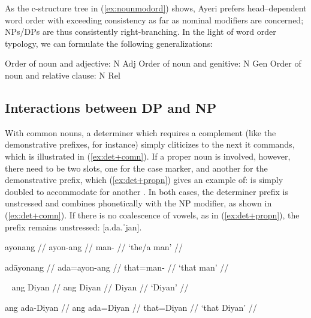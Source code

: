 As the c-structure tree in (\ref{ex:nounmodord}) shows, Ayeri prefers 
head--dependent word order with exceeding consistency as far as nominal 
modifiers are concerned; NPs/DPs are thus consistently right-branching. In the 
light of word order typology, we can formulate the following generalizations:

\pex
\a Order of noun and adjective: N Adj
\a Order of noun and genitive: N Gen
\a Order of noun and relative clause: N Rel
\xe

\subsection{Interactions between DP and NP}
\label{subsec:dpnpinteract}

With common nouns, a determiner which requires a complement (like the
demonstrative prefixes, for instance) simply cliticizes to the next 
it commands, which is illustrated in (\ref{ex:det+comn}). If a proper noun is
involved, however, there need to be two  slots, one for the case
marker, and another for the demonstrative prefix, which (\ref{ex:det+propn})
gives an example of:  is simply doubled to accommodate for another
. In both cases, the determiner prefix is unstressed and combines 
phonetically with the NP modifier, as shown in (\ref{ex:det+comn}). If there is
no coalescence of vowels, as in (\ref{ex:det+propn}), the prefix remains
unstressed:  [a.da.ˈjan].

\begin{multicols}{2}
\pex\label{ex:det+comn}
\a\begingl
	\gla ayonang //
	\glb ayon-ang //
	\glc man-\Aarg{} //
	\glft `the/a man' //
\endgl

\a\begingl
	\gla adāyonang //
	\glb ada=ayon-ang //
	\glc that=man-\Aarg{} //
	\glft `that man' //
\endgl

\xe

\pex~\label{ex:det+propn}
\a\begingl
	\gla ang Diyan //
	\glb ang Diyan //
	\glc \Aarg{} Diyan //
	\glft `Diyan' //
\endgl

\a\label{ex:case+det+propn}\begingl
	\gla ang ada-Diyan //
	\glb ang ada=Diyan //
	\glc \Aarg{} that=Diyan //
	\glft `that Diyan' //
\endgl

\xe

\end{multicols}

